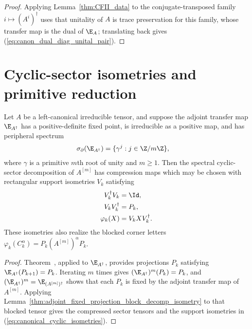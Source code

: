 \begin{proof}\leanok
    Applying Lemma~\ref{thm:CFII_data} to the conjugate-transposed family
    $i\mapsto(A^i)^\dagger$ uses that unitality of $A$ is trace preservation for this
    family, whose transfer map is the dual of $\E_A$; translating back gives
    (\ref{eq:canon_dual_diag_unital_pair}).
\end{proof}


\section{Cyclic-sector isometries and primitive reduction}


\begin{lemma}%
    \label{thm:cyclic_sector_decomp_after_blocking_isometry}
    \leanok
    Let $A$ be a left-canonical irreducible tensor, and suppose the adjoint
    transfer map $\E_{A^\dagger}$ has a positive-definite fixed point, is
    irreducible as a positive map, and has peripheral spectrum
    \begin{align}
        \sigma_\partial(\E_{A^\dagger})
         & =
        \{\gamma^j:j\in\Z/m\Z\},
        \label{eq:canonical_adjoint_cyclic_spectrum}
    \end{align}
    where $\gamma$ is a primitive $m$th root of unity and $m\ge1$. Then the
    spectral cyclic-sector decomposition of $A^{[m]}$ has compression maps
    which may be chosen with rectangular support isometries $V_k$ satisfying
    \begin{align}
        V_k^\dagger V_k
         & =\Id,
        \notag               \\
        V_kV_k^\dagger
         & =P_k,
        \notag               \\
        \varphi_k(X)
         & =V_kXV_k^\dagger.
        \label{eq:canonical_cyclic_isometries}
    \end{align}
    These isometries also realize the blocked corner letters
    $\varphi_k(C_k^\alpha)=P_k(A^{[m]})^\alpha P_k$.
    \begin{proof}\leanok
        Theorem~\cite[``Cyclic decomposition for irreducible finite Kraus maps'']{QICLean2026Blueprint}, applied to
        $\E_{A^\dagger}$, provides projections $P_k$ satisfying
        $\E_{A^\dagger}(P_{k+1})=P_k$. Iterating $m$ times gives
        $(\E_{A^\dagger})^m(P_k)=P_k$, and
        $(\E_{A^\dagger})^m=\E_{(A^{[m]})^\dagger}$ shows that each $P_k$ is
        fixed by the adjoint transfer map of $A^{[m]}$. Applying
        Lemma~\ref{thm:adjoint_fixed_projection_block_decomp_isometry} to
        that blocked tensor gives the compressed sector tensors and the
        support isometries in (\ref{eq:canonical_cyclic_isometries}).
    \end{proof}
\end{lemma}

